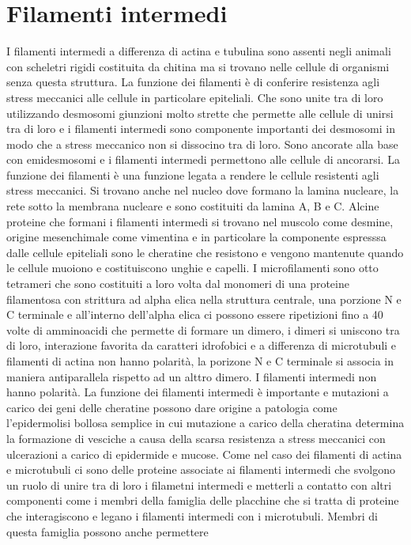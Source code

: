 \section{Filamenti intermedi}
I filamenti intermedi a differenza di actina e tubulina sono assenti negli animali con scheletri rigidi costituita da chitina ma si trovano nelle cellule di organismi senza questa
struttura. La funzione dei filamenti \`e di conferire resistenza agli stress meccanici alle cellule in particolare epiteliali. Che sono unite tra di loro utilizzando desmosomi giunzioni
molto strette che permette alle cellule di unirsi tra di loro e i filamenti intermedi sono componente importanti dei desmosomi in modo che a stress meccanico non si dissocino tra di loro.
Sono ancorate alla base con emidesmosomi e i filamenti intermedi permettono alle cellule di ancorarsi. La funzione dei filamenti \`e una funzione legata a rendere le cellule resistenti
agli stress meccanici. Si trovano anche nel nucleo dove formano la lamina nucleare, la rete sotto la membrana nucleare e sono costituiti da lamina A, B e C. Alcine proteine che formani
i filamenti intermedi si trovano nel muscolo come desmine, origine mesenchimale come vimentina e in particolare la componente espresssa dalle cellule epiteliali sono le cheratine che 
resistono e vengono mantenute quando le cellule muoiono e costituiscono unghie e capelli. I microfilamenti sono otto tetrameri che sono costituiti a loro volta dal monomeri di una 
proteine filamentosa con strittura ad alpha elica nella struttura centrale, una porzione N e C terminale e all'interno dell'alpha elica ci possono essere ripetizioni fino a 40 volte di
amminoacidi che permette di formare un dimero, i dimeri si uniscono tra di loro, interazione favorita da caratteri idrofobici e a differenza di microtubuli e filamenti di actina non
hanno polarit\`a, la porizone N e C terminale si associa in maniera antiparallela rispetto ad un alttro dimero. I filamenti intermedi non hanno polarit\`a. La funzione dei filamenti 
intermedi \`e importante e mutazioni a carico dei geni delle cheratine possono dare origine a patologia come l'epidermolisi bollosa semplice in cui mutazione a carico della cheratina
determina la formazione di vesciche a causa della scarsa resistenza a stress meccanici con ulcerazioni a carico di epidermide e mucose. Come nel caso dei filamenti di actina e 
microtubuli ci sono delle proteine associate ai filamenti intermedi che svolgono un ruolo di unire tra di loro i filametni intermedi e metterli a contatto con altri componenti come i 
membri della famiglia delle placchine che si tratta di proteine che interagiscono e legano i filamenti intermedi con i microtubuli. Membri di questa famiglia possono anche permettere
